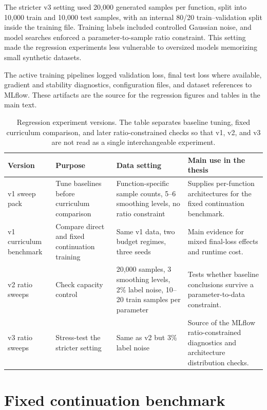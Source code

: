 The stricter v3 setting used 20,000 generated samples per function, split into
10,000 train and 10,000 test samples, with an internal 80/20 train--validation
split inside the training file. Training labels included controlled Gaussian
noise, and model searches enforced a parameter-to-sample ratio constraint. This
setting made the regression experiments less vulnerable to oversized models
memorizing small synthetic datasets.

The active training pipelines logged validation loss, final test loss where
available, gradient and stability diagnostics, configuration files, and dataset
references to MLflow. These artifacts are the source for the regression figures
and tables in the main text.

\begin{table}[h]
\centering
\scriptsize
\setlength{\tabcolsep}{3pt}
\begin{tabular}{@{}p{}p{}p{}p{}@{}}
\toprule
Version & Purpose & Data setting & Main use in the thesis \\
\midrule
v1 sweep pack & Tune baselines before curriculum comparison & Function-specific sample counts, 5--6 smoothing levels, no ratio constraint & Supplies per-function architectures for the fixed continuation benchmark. \\
v1 curriculum benchmark & Compare direct and fixed continuation training & Same v1 data, two budget regimes, three seeds & Main evidence for mixed final-loss effects and runtime cost. \\
v2 ratio sweeps & Check capacity control & 20,000 samples, 3 smoothing levels, 2\% label noise, 10--20 train samples per parameter & Tests whether baseline conclusions survive a parameter-to-data constraint. \\
v3 ratio sweeps & Stress-test the stricter setting & Same as v2 but 3\% label noise & Source of the MLflow ratio-constrained diagnostics and architecture distribution checks. \\
\bottomrule
\end{tabular}
\caption{Regression experiment versions. The table separates baseline tuning,
fixed curriculum comparison, and later ratio-constrained checks so that v1, v2,
and v3 are not read as a single interchangeable experiment.}
\label{tab:app-regression-version-summary}
\end{table}

\section{Fixed continuation benchmark}
\label{app:curr-vs-single-v1}

